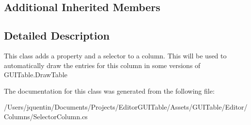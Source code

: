 \subsection*{Additional Inherited Members}


\subsection{Detailed Description}
This class adds a property and a selector to a column. This will be used to automatically draw the entries for this column in some versions of G\+U\+I\+Table.\+Draw\+Table 



The documentation for this class was generated from the following file\+:\begin{DoxyCompactItemize}
\item 
/\+Users/jquentin/\+Documents/\+Projects/\+Editor\+G\+U\+I\+Table/\+Assets/\+G\+U\+I\+Table/\+Editor/\+Columns/Selector\+Column.\+cs\end{DoxyCompactItemize}
